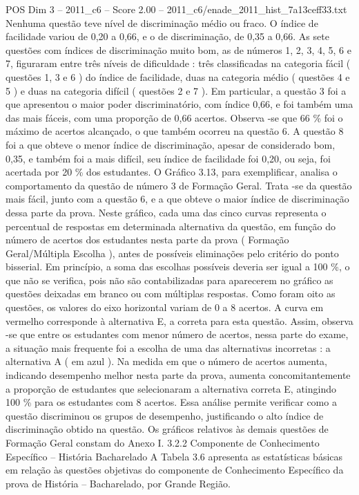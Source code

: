 \begin{textsample}{POS Dim 3 – 2011\_c6 – Score 2.00 – 2011\_c6/enade\_2011\_hist\_7a13ceff33.txt}
Nenhuma questão teve nível de discriminação médio ou fraco.
O índice de facilidade variou de 0,20 a 0,66, e o de discriminação, de 0,35 a 0,66.
As sete questões com índices de discriminação muito bom, as de números 1, 2, 3, 4, 5, 6 e 7, figuraram entre três níveis de dificuldade : três classificadas na categoria fácil ( questões 1, 3 e 6 ) do índice de facilidade, duas na categoria médio ( questões 4 e 5 ) e duas na categoria difícil ( questões 2 e 7 ).
Em particular, a questão 3 foi a que apresentou o maior poder discriminatório, com índice 0,66, e foi também uma das mais fáceis, com uma proporção de 0,66 acertos.
Observa -se que 66 \% foi o máximo de acertos alcançado, o que também ocorreu na questão 6.
A questão 8 foi a que obteve o menor índice de discriminação, apesar de considerado bom, 0,35, e também foi a mais difícil, seu índice de facilidade foi 0,20, ou seja, foi acertada por 20 \% dos estudantes.
O Gráfico 3.13, para exemplificar, analisa o comportamento da questão de número 3 de Formação Geral.
Trata -se da questão mais fácil, junto com a questão 6, e a que obteve o maior índice de discriminação dessa parte da prova.
Neste gráfico, cada uma das cinco curvas representa o percentual de respostas em determinada alternativa da questão, em função do número de acertos dos estudantes nesta parte da prova ( Formação Geral/Múltipla Escolha ), antes de possíveis eliminações pelo critério do ponto bisserial.
Em princípio, a soma das escolhas possíveis deveria ser igual a 100 \%, o que não se verifica, pois não são contabilizadas para aparecerem no gráfico as questões deixadas em branco ou com múltiplas respostas.
Como foram oito as questões, os valores do eixo horizontal variam de 0 a 8 acertos.
A curva em vermelho corresponde à alternativa E, a correta para esta questão.
Assim, observa -se que entre os estudantes com menor número de acertos, nessa parte do exame, a situação mais frequente foi a escolha de uma das alternativas incorretas : a alternativa A ( em azul ).
Na medida em que o número de acertos aumenta, indicando desempenho melhor nesta parte da prova, aumenta concomitantemente a proporção de estudantes que selecionaram a alternativa correta E, atingindo 100 \% para os estudantes com 8 acertos.
Essa análise permite verificar como a questão discriminou os grupos de desempenho, justificando o alto índice de discriminação obtido na questão.
Os gráficos relativos às demais questões de Formação Geral constam do Anexo I. 3.2.2 Componente de Conhecimento Específico – História Bacharelado A Tabela 3.6 apresenta as estatísticas básicas em relação às questões objetivas do componente de Conhecimento Específico da prova de História – Bacharelado, por Grande Região.

\end{textsample}
